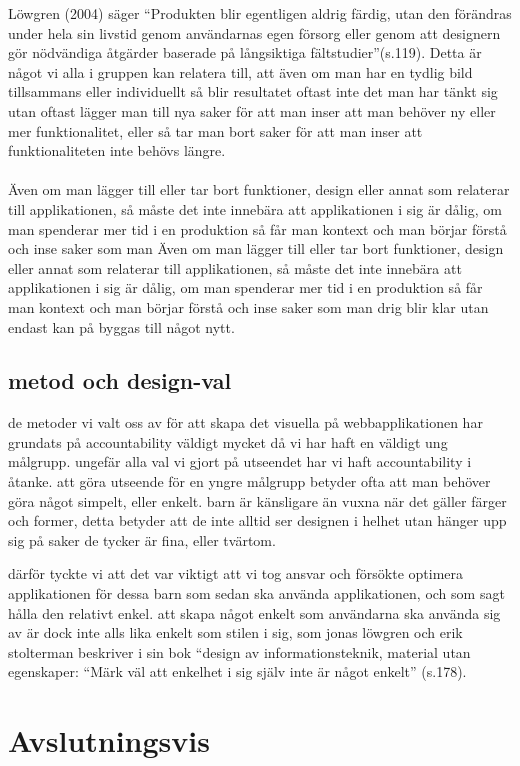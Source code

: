 \documentclass[12pt, titlepage]{article}
\begin{document}
Löwgren (2004) säger “Produkten blir egentligen aldrig färdig, utan den förändras 
under hela sin livstid genom användarnas egen försorg eller genom att designern gör nödvändiga åtgärder 
baserade på långsiktiga fältstudier”(s.119). Detta är något vi alla i gruppen kan relatera till, 
att även om man har en tydlig bild tillsammans eller individuellt så blir resultatet oftast inte det man har tänkt 
sig utan oftast lägger man till nya saker för att man inser att man behöver ny eller mer funktionalitet, 
eller så tar man bort saker för att man inser att funktionaliteten inte behövs längre.
\\
\\
Även om man lägger till eller tar bort funktioner, design eller annat som relaterar till applikationen, 
så måste det inte innebära att applikationen i sig är dålig, om man spenderar mer tid i en produktion 
så får man kontext och man börjar förstå och inse saker som man 
Även om man lägger till eller tar bort funktioner, design eller annat som relaterar till 
applikationen, så måste det inte innebära att applikationen i sig är dålig, om 
man spenderar mer tid i en produktion så får man kontext och man börjar förstå 
och inse saker som man drig blir klar utan endast kan på byggas till något nytt.

\subsection{metod och design-val}
de metoder vi valt oss av för att skapa det visuella på webbapplikationen har grundats på accountability 
väldigt mycket då vi har haft en väldigt ung målgrupp. ungefär alla val vi gjort på utseendet har vi 
haft accountability i åtanke. att göra utseende för en yngre målgrupp betyder ofta att man behöver göra något simpelt, 
eller enkelt. barn är känsligare än vuxna när det gäller färger och former, detta betyder att de inte alltid ser designen i helhet 
utan hänger upp sig på saker de tycker är fina, eller tvärtom. 

därför tyckte vi att det var viktigt att vi tog ansvar 
och försökte optimera applikationen för dessa barn som sedan ska använda applikationen, och som sagt hålla den relativt enkel. 
att skapa något enkelt som användarna ska använda sig av är dock inte alls lika enkelt som stilen i sig, 
som jonas löwgren och erik stolterman beskriver i sin bok “design av informationsteknik, material utan egenskaper: 
“Märk väl att enkelhet i sig själv inte är något enkelt” (s.178).
\newpage
\section{Avslutningsvis}
\end{document}
